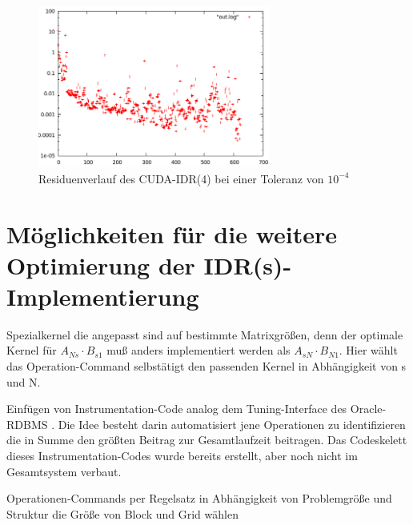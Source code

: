 \documentclass[journal]{IEEEtran}
\begin{document}
\begin{figure}[htbp]

   \includegraphics[width=3in]{pix/bastian/image002.png}

   \caption{ \label{residuum} Residuenverlauf des CUDA-IDR(4) bei einer Toleranz von $10^{-4}$ }%

\end{figure}



\section{Möglichkeiten für die weitere Optimierung der IDR(s)-Implementierung}

\begin{itemize}
 \begin{item}
Spezialkernel die angepasst
sind auf bestimmte Matrixgrößen, denn der optimale Kernel für
 $A_{Ns} \cdot B_{s1}$ muß anders implementiert werden als  $A_{sN} \cdot B_{N1}$.
Hier wählt das Operation-Command selbstätigt den passenden Kernel in Abhängigkeit
von s und N.
 \end{item}

\begin{item}

Einfügen von Instrumentation-Code analog dem Tuning-Interface des Oracle-RDBMS \cite{oracle}. Die Idee besteht darin
automatisiert jene Operationen zu identifizieren die in Summe den größten
Beitrag zur Gesamtlaufzeit beitragen.
Das Codeskelett dieses Instrumentation-Codes wurde bereits erstellt,
aber noch nicht im Gesamtsystem verbaut.
\end{item}

\begin{item}
 Operationen-Commands per Regelsatz in Abhängigkeit von Problemgröße und
        Struktur die Größe von Block und Grid wählen
\end{item}
\end{itemize}
\end{document}
